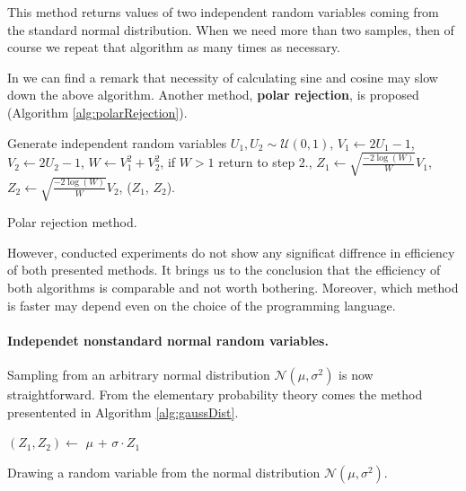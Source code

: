 \documentclass[a4paper,11pt, twoside]{book}
\theoremstyle{definition}
\theoremstyle{remark}
\begin{document}
This method returns values of two independent random variables coming from the standard normal distribution. When we need more than two samples, then of course we repeat that algorithm as many times as necessary.

In \cite{london} we can find a remark that necessity of calculating sine and cosine may slow down the above algorithm. Another method, \textbf{polar rejection}, is proposed (Algorithm \ref{alg:polarRejection}).
\begin{algorithm}[!ht]
 \begin{algorithmic}[1]
    \State Generate independent random variables $U_1, U_2 \sim \mathcal{U}(0,1)$,
    \State $V_1 \gets 2U_1-1$,
    \State $V_2 \gets 2U_2-1$,
    \State $W \gets V_1^2 + V_2^2$,
    \State if $W > 1$ return to step 2.,
    \State $Z_1 \gets \sqrt{\frac{-2\log(W)}{W}} V_1$,
    \State $Z_2 \gets \sqrt{\frac{-2\log(W)}{W}} V_2$,
    \State \Return ($Z_1$, $Z_2$).
  \EndFunction
 \end{algorithmic}
 \caption{Polar rejection method.}
 \label{alg:polarRejection}
\end{algorithm}
However, conducted experiments do not show any significat diffrence in efficiency of both presented methods. It brings us to the conclusion that the efficiency of both algorithms is comparable and not worth bothering. Moreover, which method is faster may depend even on the choice of the programming language.

\paragraph{Independet nonstandard normal random variables.} Sampling from an arbitrary normal distribution $\mathcal{N}(\mu, \sigma^2)$ is now straightforward. From the elementary probability theory comes the method presentented in Algorithm \ref{alg:gaussDist}.
\begin{algorithm}[!ht]
 \begin{algorithmic}[1]
    \State $(Z_1, Z_2) \gets $ 
    \State \Return $\mu$ + $\sigma \cdot Z_1$
  \EndFunction
 \end{algorithmic}
 \caption{Drawing a random variable from the normal distribution $\mathcal{N}(\mu, \sigma^2)$.}
 \label{alg:gaussDist}
\end{algorithm}
\end{document}

